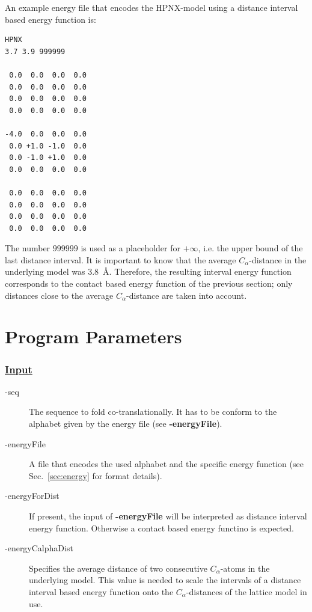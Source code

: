 \documentclass{article}
\newenvironment{boxit}{\begin{lrbox}{\savepar}\begin{minipage}[t]{0.8\textwidth}}
                      {\end{minipage}\end{lrbox}\fbox{\usebox{\savepar}}}
\begin{document}
An example energy file that encodes the HPNX-model using a distance interval
based energy function is:

\begin{center}
\begin{boxit}
\small
\begin{verbatim}
HPNX
3.7 3.9 999999

 0.0  0.0  0.0  0.0
 0.0  0.0  0.0  0.0
 0.0  0.0  0.0  0.0
 0.0  0.0  0.0  0.0

-4.0  0.0  0.0  0.0
 0.0 +1.0 -1.0  0.0
 0.0 -1.0 +1.0  0.0
 0.0  0.0  0.0  0.0

 0.0  0.0  0.0  0.0
 0.0  0.0  0.0  0.0
 0.0  0.0  0.0  0.0
 0.0  0.0  0.0  0.0
\end{verbatim}
\end{boxit}
\end{center}

The number $999999$ is used as a placeholder for $+\infty$, i.e. the upper bound
of the last distance interval. It is important to know that the average
$C_\alpha$-distance in the underlying model was 3.8~\AA. Therefore, the resulting
interval energy function corresponds to the contact based energy function of the
previous section; only distances close to the average $C_\alpha$-distance are
taken into account.


\section{Program Parameters}
\label{sec:parameter}

\subsubsection*{\underline{ Input }}

\begin{description}
	\item[-seq] The sequence to fold co-translationally. It has to be conform
	to the alphabet given by the energy file (see {\bfseries -energyFile}).
	\item[-energyFile] A file that encodes the used alphabet and the
	specific energy function (see Sec.~\ref{sec:energy} for format details).
	\item[-energyForDist] If present, the input of {\bfseries -energyFile} will be
	interpreted as distance interval energy function. Otherwise a contact based
	energy functino is expected.
	\item[-energyCalphaDist] Specifies the average distance of two
	consecutive $C_\alpha$-atoms in the underlying model. This value is needed to
	scale the intervals of a distance interval based energy function onto the
	$C_\alpha$-distances of the lattice model in use.
\end{description}
\end{document}
